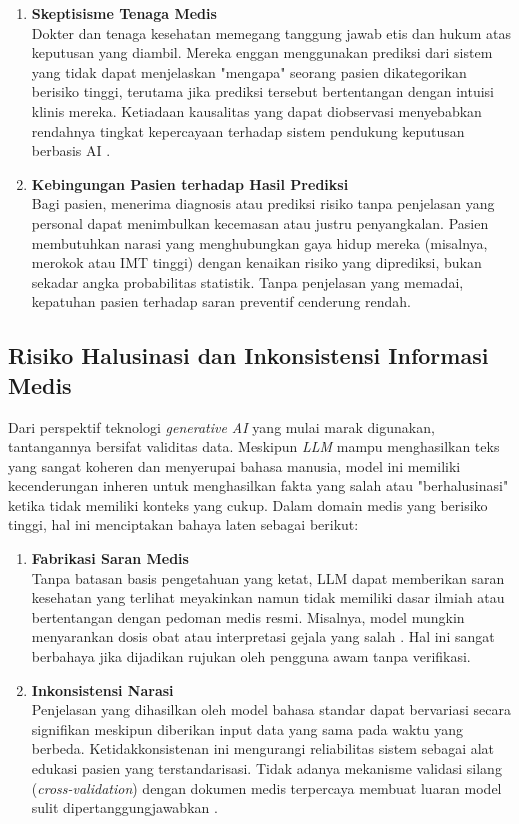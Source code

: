 \begin{enumerate}
    \item \textbf{Skeptisisme Tenaga Medis}\\
    Dokter dan tenaga kesehatan memegang tanggung jawab etis dan hukum atas keputusan yang diambil. Mereka enggan menggunakan prediksi dari sistem yang tidak dapat menjelaskan "mengapa" seorang pasien dikategorikan berisiko tinggi, terutama jika prediksi tersebut bertentangan dengan intuisi klinis mereka. Ketiadaan kausalitas yang dapat diobservasi menyebabkan rendahnya tingkat kepercayaan terhadap sistem pendukung keputusan berbasis AI \parencite{Linardatos2021Explainable}.
    
    \item \textbf{Kebingungan Pasien terhadap Hasil Prediksi}\\
    Bagi pasien, menerima diagnosis atau prediksi risiko tanpa penjelasan yang personal dapat menimbulkan kecemasan atau justru penyangkalan. Pasien membutuhkan narasi yang menghubungkan gaya hidup mereka (misalnya, merokok atau IMT tinggi) dengan kenaikan risiko yang diprediksi, bukan sekadar angka probabilitas statistik. Tanpa penjelasan yang memadai, kepatuhan pasien terhadap saran preventif cenderung rendah.

\end{enumerate}

\subsection{Risiko Halusinasi dan Inkonsistensi Informasi Medis}
Dari perspektif teknologi \textit{generative AI} yang mulai marak digunakan, tantangannya bersifat validitas data. Meskipun \textit{LLM} mampu menghasilkan teks yang sangat koheren dan menyerupai bahasa manusia, model ini memiliki kecenderungan inheren untuk menghasilkan fakta yang salah atau "berhalusinasi" ketika tidak memiliki konteks yang cukup. Dalam domain medis yang berisiko tinggi, hal ini menciptakan bahaya laten sebagai berikut:

\begin{enumerate}
    \item \textbf{Fabrikasi Saran Medis}\\
    Tanpa batasan basis pengetahuan yang ketat, LLM dapat memberikan saran kesehatan yang terlihat meyakinkan namun tidak memiliki dasar ilmiah atau bertentangan dengan pedoman medis resmi. Misalnya, model mungkin menyarankan dosis obat atau interpretasi gejala yang salah \parencite{Li2023ChatGPT}. Hal ini sangat berbahaya jika dijadikan rujukan oleh pengguna awam tanpa verifikasi.
    
    \item \textbf{Inkonsistensi Narasi}\\
    Penjelasan yang dihasilkan oleh model bahasa standar dapat bervariasi secara signifikan meskipun diberikan input data yang sama pada waktu yang berbeda. Ketidakkonsistenan ini mengurangi reliabilitas sistem sebagai alat edukasi pasien yang terstandarisasi. Tidak adanya mekanisme validasi silang (\textit{cross-validation}) dengan dokumen medis terpercaya membuat luaran model sulit dipertanggungjawabkan \parencite{Zhang2023Survey}.
\end{enumerate}

